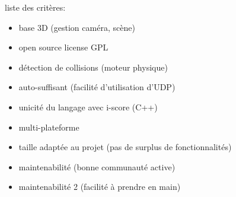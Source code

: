 liste des critères:
\begin{itemize}
\item base 3D (gestion caméra, scène)
\item open source license GPL
\item détection de collisions (moteur physique)
\item auto-suffisant (facilité d'utilisation d'UDP)
\item unicité du langage avec i-score (C++)
\item multi-plateforme
\item taille adaptée au projet (pas de surplus de fonctionnalités)
\item maintenabilité (bonne communauté active)
\item maintenabilité 2 (facilité à prendre en main)
\end{itemize}